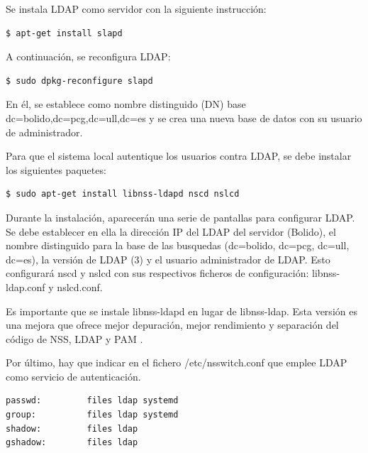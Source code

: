 \vspace{2mm}
Se instala LDAP como servidor con la siguiente instrucción:
\vspace{2mm}

\begin{lstlisting}[language=bash]
    $ apt-get install slapd
\end{lstlisting}
\vspace{2mm}

A continuación, se reconfigura LDAP:
\vspace{2mm}

\begin{lstlisting}[language=bash]
    $ sudo dpkg-reconfigure slapd
\end{lstlisting}
\vspace{2mm}
En él, se establece como nombre distinguido (DN) base dc=bolido,dc=pcg,dc=ull,dc=es y se crea una nueva base de datos con su usuario de administrador.
\vspace{2mm}

Para que el sistema local autentique los usuarios contra LDAP, se debe instalar los siguientes paquetes:

\vspace{2mm}
\begin{lstlisting}[language=bash]
    $ sudo apt-get install libnss-ldapd nscd nslcd
\end{lstlisting}
\vspace{2mm}

Durante la instalación, aparecerán una serie de pantallas para configurar LDAP. Se debe establecer en ella la dirección IP del LDAP del servidor (Bolido), el nombre distinguido para la base de las busquedas (dc=bolido, dc=pcg, dc=ull, dc=es), la versión de LDAP (3) y el usuario administrador de LDAP. Esto configurará nscd y nslcd con sus respectivos ficheros de configuración: libnss-ldap.conf y nslcd.conf.
\vspace{2mm}

Es importante que se instale libnss-ldapd en lugar de libnss-ldap. Esta versión es una mejora que ofrece mejor depuración, mejor rendimiento y separación del código de NSS, LDAP y PAM \cite{libnsspamd}. 
\vspace{2mm}

Por último, hay que indicar en el fichero /etc/nsswitch.conf que emplee LDAP como servicio de autenticación.
\vspace{2mm}
\begin{lstlisting}[language=bash,caption={Fichero /etc/nsswitch.conf},xleftmargin=.25\textwidth]
passwd:         files ldap systemd 
group:          files ldap systemd
shadow:         files ldap
gshadow:        files ldap

\end{lstlisting}
\vspace{2mm}

